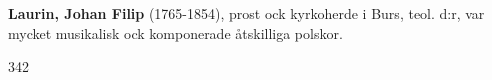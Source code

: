 \textbf{Laurin, Johan Filip} (1765-1854), prost ock kyrkoherde i Burs, teol. d:r, var mycket musikalisk ock komponerade åtskilliga polskor. 

342 
